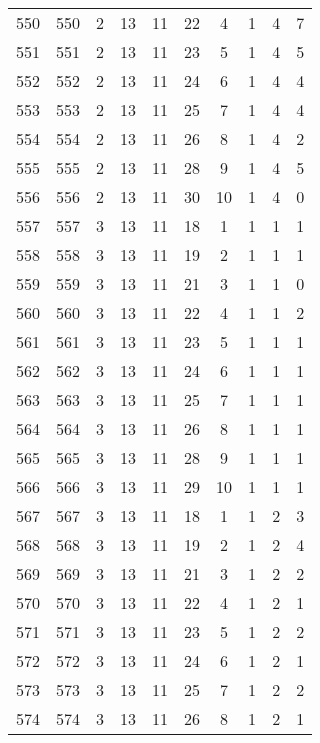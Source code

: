 \begin{longtable}{cccccccccc}
  550 & 550 &   2 &  13 &  11 &  22 &   4 &   1 &   4 &   7 \\ 
  551 & 551 &   2 &  13 &  11 &  23 &   5 &   1 &   4 &   5 \\ 
  552 & 552 &   2 &  13 &  11 &  24 &   6 &   1 &   4 &   4 \\ 
  553 & 553 &   2 &  13 &  11 &  25 &   7 &   1 &   4 &   4 \\ 
  554 & 554 &   2 &  13 &  11 &  26 &   8 &   1 &   4 &   2 \\ 
  555 & 555 &   2 &  13 &  11 &  28 &   9 &   1 &   4 &   5 \\ 
  556 & 556 &   2 &  13 &  11 &  30 &  10 &   1 &   4 &   0 \\ 
  557 & 557 &   3 &  13 &  11 &  18 &   1 &   1 &   1 &   1 \\ 
  558 & 558 &   3 &  13 &  11 &  19 &   2 &   1 &   1 &   1 \\ 
  559 & 559 &   3 &  13 &  11 &  21 &   3 &   1 &   1 &   0 \\ 
  560 & 560 &   3 &  13 &  11 &  22 &   4 &   1 &   1 &   2 \\ 
  561 & 561 &   3 &  13 &  11 &  23 &   5 &   1 &   1 &   1 \\ 
  562 & 562 &   3 &  13 &  11 &  24 &   6 &   1 &   1 &   1 \\ 
  563 & 563 &   3 &  13 &  11 &  25 &   7 &   1 &   1 &   1 \\ 
  564 & 564 &   3 &  13 &  11 &  26 &   8 &   1 &   1 &   1 \\ 
  565 & 565 &   3 &  13 &  11 &  28 &   9 &   1 &   1 &   1 \\ 
  566 & 566 &   3 &  13 &  11 &  29 &  10 &   1 &   1 &   1 \\ 
  567 & 567 &   3 &  13 &  11 &  18 &   1 &   1 &   2 &   3 \\ 
  568 & 568 &   3 &  13 &  11 &  19 &   2 &   1 &   2 &   4 \\ 
  569 & 569 &   3 &  13 &  11 &  21 &   3 &   1 &   2 &   2 \\ 
  570 & 570 &   3 &  13 &  11 &  22 &   4 &   1 &   2 &   1 \\ 
  571 & 571 &   3 &  13 &  11 &  23 &   5 &   1 &   2 &   2 \\ 
  572 & 572 &   3 &  13 &  11 &  24 &   6 &   1 &   2 &   1 \\ 
  573 & 573 &   3 &  13 &  11 &  25 &   7 &   1 &   2 &   2 \\ 
  574 & 574 &   3 &  13 &  11 &  26 &   8 &   1 &   2 &   1 \\ 

\end{longtable}
